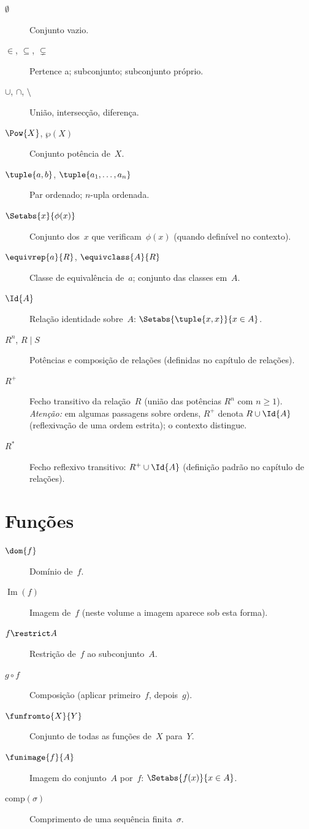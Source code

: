 \begin{description}
\item[$\emptyset$] Conjunto vazio.
\item[$\in$, $\subseteq$, $\subsetneq$] Pertence a; subconjunto; subconjunto próprio.
\item[$\cup$, $\cap$, $\setminus$] União, intersecção, diferença.
\item[$\Pow{X}$, $\wp(X)$] Conjunto potência de~$X$.
\item[$\tuple{a,b}$, $\tuple{a_1,\ldots,a_n}$] Par ordenado; $n$-upla ordenada.
\item[$\Setabs{x}{\phi(x)}$] Conjunto dos~$x$ que verificam~$\phi(x)$ (quando definível no contexto).
\item[$\equivrep{a}{R}$, $\equivclass{A}{R}$] Classe de equivalência de~$a$; conjunto das classes em~$A$.
\item[$\Id{A}$] Relação identidade sobre~$A$: $\Setabs{\tuple{x,x}}{x \in A}$.
\item[$R^n$, $R \mid S$] Potências e composição de relações (definidas no capítulo de relações).
\item[$R^+$] Fecho transitivo da relação~$R$ (união das potências $R^n$ com $n \geq 1$). \emph{Atenção:} em algumas passagens sobre ordens, $R^+$ denota $R \cup \Id{A}$ (reflexivação de uma ordem estrita); o contexto distingue.
\item[$R^*$] Fecho reflexivo transitivo: $R^+ \cup \Id{A}$ (definição padrão no capítulo de relações).
\end{description}

\section*{Funções}

\begin{description}
\item[$\dom{f}$] Domínio de~$f$.
\item[$\operatorname{Im}(f)$] Imagem de~$f$ (neste volume a imagem aparece sob esta forma).
\item[$f \restrict A$] Restrição de~$f$ ao subconjunto~$A$.
\item[$g \circ f$] Composição (aplicar primeiro~$f$, depois~$g$).
\item[$\funfromto{X}{Y}$] Conjunto de todas as funções de~$X$ para~$Y$.
\item[$\funimage{f}{A}$] Imagem do conjunto~$A$ por~$f$: $\Setabs{f(x)}{x \in A}$.
\item[$\mathrm{comp}(\sigma)$] Comprimento de uma sequência finita~$\sigma$.
\end{description}

